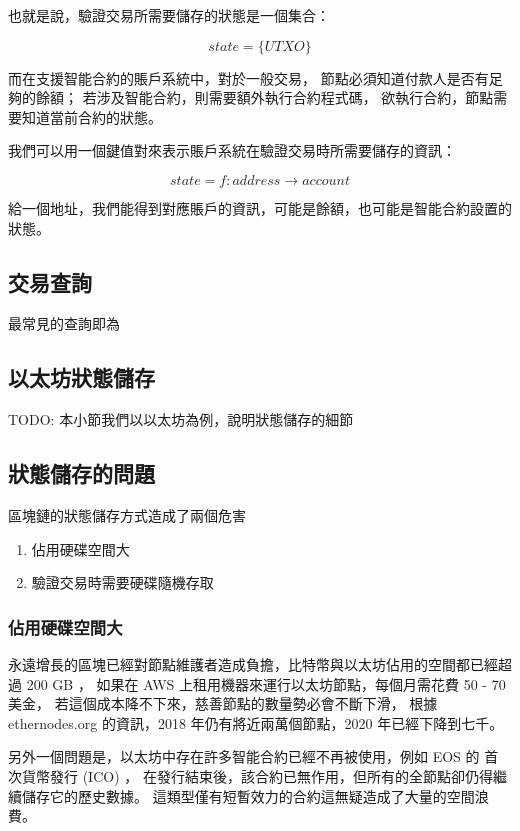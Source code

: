 也就是說，驗證交易所需要儲存的狀態是一個集合：

\[state = \{UTXO\}\]

而在支援智能合約的賬戶系統中，對於一般交易，
節點必須知道付款人是否有足夠的餘額；
若涉及智能合約，則需要額外執行合約程式碼，
欲執行合約，節點需要知道當前合約的狀態。

我們可以用一個鍵值對來表示賬戶系統在驗證交易時所需要儲存的資訊：

\[state = f: address\to account \]

給一個地址，我們能得到對應賬戶的資訊，可能是餘額，也可能是智能合約設置的狀態。

\subsection{交易查詢}

最常見的查詢即為

\subsection{以太坊狀態儲存}

TODO: 本小節我們以以太坊為例，說明狀態儲存的細節

\subsection{狀態儲存的問題}

區塊鏈的狀態儲存方式造成了兩個危害

\begin{enumerate}
  \item 佔用硬碟空間大
  \item 驗證交易時需要硬碟隨機存取
\end{enumerate}

\subsubsection{佔用硬碟空間大}

永遠增長的區塊已經對節點維護者造成負擔，比特幣與以太坊佔用的空間都已經超過 200 GB ，
如果在 AWS 上租用機器來運行以太坊節點，每個月需花費 50 - 70 美金，
若這個成本降不下來，慈善節點的數量勢必會不斷下滑，
根據 ethernodes.org 的資訊，2018 年仍有將近兩萬個節點，2020 年已經下降到七千。

另外一個問題是，以太坊中存在許多智能合約已經不再被使用，例如 EOS 的 首次貨幣發行 (ICO) ，
在發行結束後，該合約已無作用，但所有的全節點卻仍得繼續儲存它的歷史數據。
這類型僅有短暫效力的合約這無疑造成了大量的空間浪費。

